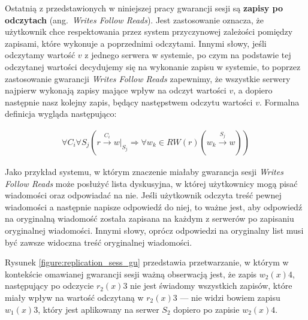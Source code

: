 Ostatnią z przedstawionych w niniejszej pracy gwarancji sesji są \textbf{zapisy po odczytach} (ang.\ \textit{Writes Follow Reads}). Jest zastosowanie oznacza, że użytkownik chce respektowania przez system przyczynowej zależości pomiędzy zapisami, które wykonuje a poprzednimi odczytami. Innymi słowy, jeśli odczytamy wartość $ v $ z jednego serwera w systemie, po czym na podstawie tej odczytanej wartości decydujemy się na wykonanie zapisu w systemie, to poprzez zastosowanie gwarancji \textit{Writes Follow Reads} zapewnimy, że wszystkie serwery najpierw wykonają zapisy mające wpływ na odczyt wartości $ v $, a dopiero następnie nasz kolejny zapis, będący następstwem odczytu wartości $ v $. Formalna definicja wygląda następująco:

\begin{align*}
    \forall{C_i} \forall{S_j} (r \xrightarrow{C_i} w|_{S_j} \Rightarrow \forall{w_k} \in RW(r) (w_k \xrightarrow{S_j} w))
\end{align*}

Jako przykład systemu, w którym znaczenie miałaby gwarancja sesji \textit{Writes Follow Reads} może posłużyć lista dyskusyjna, w której użytkownicy mogą pisać wiadomości oraz odpowiadać na nie. Jeśli użytkownik odczyta treść pewnej wiadomości a następnie napisze odpowiedź do niej, to ważne jest, aby odpowiedź na oryginalną wiadomość została zapisana na każdym z serwerów po zapisaniu oryginalnej wiadomości. Innymi słowy, oprócz odpowiedzi na oryginalny list musi być zawsze widoczna treść oryginalnej wiadomości.

Rysunek \ref{figure:replication_sess_gu} przedstawia przetwarzanie, w którym w kontekście omawianej gwarancji sesji ważną obserwacją jest, że zapis $ w_2(x)4 $, następujący po odczycie $ r_2(x)3 $ nie jest świadomy wszystkich zapisów, które miały wpływ na wartość odczytaną w $ r_2(x)3 $ --- nie widzi bowiem zapisu $ w_1(x)3 $, który jest aplikowany na serwer $ S_2 $ dopiero po zapisie $ w_2(x)4 $.
